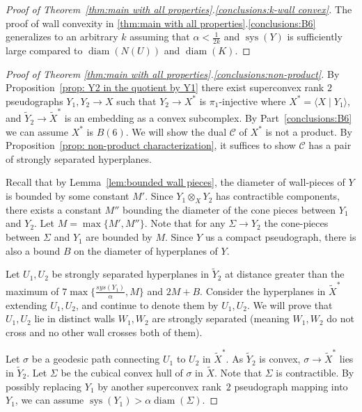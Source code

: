 \documentclass[12pt,oneside]{amsart}
\theoremstyle{definition}
\theoremstyle{definition}
\theoremstyle{remark}
\DeclareMathOperator{\diam}{\text{diam}}
\DeclareMathOperator{\sys}{\mathrm sys}
\begin{document}
\begin{proof}[Proof of Theorem~\ref{thm:main with all properties}.\eqref{conclusions:k-wall convex}]

The proof of wall convexity in \ref{thm:main with all properties}.\eqref{conclusions:B6} generalizes to an arbitrary $k$ assuming that $\alpha<\frac{1}{2k}$ and $\sys(Y)$ is sufficiently large compared to $\diam(N(U))$ and $\diam(K)$.
\end{proof}



\begin{proof}[Proof of Theorem \ref{thm:main with all properties}.\eqref{conclusions:non-product}]
By Proposition~\ref{prop: Y2 in the quotient by Y1} there exist superconvex rank $2$ pseudographs $Y_1, Y_2\to X$ such that $Y_2\to X^*$ is $\pi_1$-injective where $X^* = \langle X \mid Y_1\rangle$, and $\widetilde Y_2 \to \widetilde X^*$ is an embedding as a convex subcomplex.  By Part~\eqref{conclusions:B6} we can assume $X^*$ is $B(6)$.
We will show the dual $\mathcal C$ of $X^*$ is not a product. By  Proposition~\ref{prop: non-product characterization}, it suffices to show $\mathcal C$ has a pair of strongly separated hyperplanes.

Recall that by Lemma~\ref{lem:bounded wall pieces}, the diameter of wall-pieces of $Y$ is bounded by some constant $M'$. Since $Y_1\otimes_X Y_2$ has contractible components, there exists a constant $M''$ bounding the diameter of the cone pieces between $Y_1$ and $Y_2$. Let $M=\max\{M',M''\}$. Note that for any $\Sigma\to Y_2$ the cone-pieces between $\Sigma$ and $Y_1$ are bounded by $M$.
Since $Y$ us a compact pseudograph, there is also a bound $B$ on the diameter of hyperplanes of $Y$. 

Let $U_1, U_2$ be strongly separated hyperplanes in $\widetilde Y_2$  at distance greater than the maximum of $7\max\{\frac{sys(Y_1)}{\alpha}, M\}$ and $2M+B$.
Consider the hyperplanes in  $\widetilde X^*$ extending $U_1, U_2$, and continue to denote them by $U_1, U_2$.
We will prove that $U_1,U_2$ lie in distinct walls $W_1, W_2$ are strongly separated (meaning $W_1, W_2$ do not cross and no other wall crosses both of them). 

Let $\sigma$ be a geodesic path connecting $U_1$ to $U_2$ in $\widetilde X^*$. 
As $\widetilde Y_2$ is convex,  $\sigma\rightarrow \widetilde X^*$ lies in $\widetilde Y_2$. 
Let $\Sigma$ be the cubical convex hull of $\sigma$ in $\widetilde X$. Note that $\Sigma$ is contractible. 
By possibly replacing $Y_1$ by another superconvex rank~$2$ pseudograph mapping into $Y_1$, we can assume $\sys(Y_1)> \alpha \diam(\Sigma)$.


\end{proof}
\end{document}

